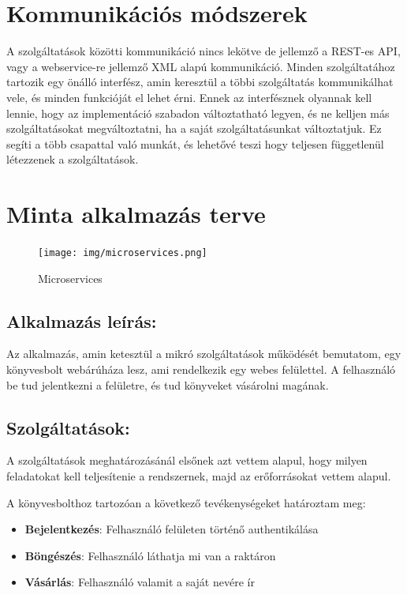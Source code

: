 \documentclass[11pt,magyar,a4paper,oneside,]{report}
\providecommand{\tightlist}{%
  \setlength{\itemsep}{0pt}\setlength{\parskip}{0pt}}
\begin{document}
\chapter{Kommunikációs
módszerek}\label{kommunikuxe1ciuxf3s-muxf3dszerek}

A szolgáltatások közötti kommunikáció nincs lekötve de jellemző a
REST-es API, vagy a webservice-re jellemző XML alapú kommunikáció.
Minden szolgáltatához tartozik egy önálló interfész, amin keresztül a
többi szolgáltatás kommunikálhat vele, és minden funkcióját el lehet
érni. Ennek az interfésznek olyannak kell lennie, hogy az implementáció
szabadon változtatható legyen, és ne kelljen más szolgáltatásokat
megváltoztatni, ha a saját szolgáltatásunkat változtatjuk. Ez segíti a
több csapattal való munkát, és lehetővé teszi hogy teljesen függetlenül
létezzenek a szolgáltatások.

\chapter{Minta alkalmazás terve}\label{minta-alkalmazuxe1s-terve}

\begin{figure}[htbp]
\centering
\texttt{[image: img/microservices.png]}
\caption{Microservices}
\end{figure}

\section{Alkalmazás leírás:}\label{alkalmazuxe1s-leuxedruxe1s}

Az alkalmazás, amin ketesztül a mikró szolgáltatások működését
bemutatom, egy könyvesbolt webárúháza lesz, ami rendelkezik egy webes
felülettel. A felhasználó be tud jelentkezni a felületre, és tud
könyveket vásárolni magának.

\section{Szolgáltatások:}\label{szolguxe1ltatuxe1sok}

A szolgáltatások meghatározásánál elsőnek azt vettem alapul, hogy milyen
feladatokat kell teljesítenie a rendszernek, majd az erőforrásokat
vettem alapul.

A könyvesbolthoz tartozóan a következő tevékenységeket határoztam meg:

\begin{itemize}
\tightlist
\item
  \textbf{Bejelentkezés}: Felhasználó felületen történő authentikálása
\item
  \textbf{Böngészés}: Felhasználó láthatja mi van a raktáron
\item
  \textbf{Vásárlás}: Felhasználó valamit a saját nevére ír
\end{itemize}
\end{document}
